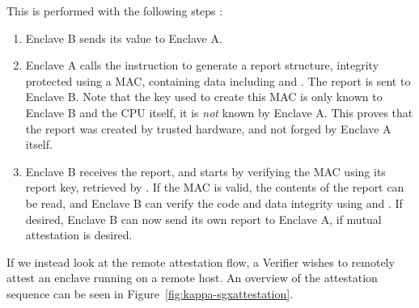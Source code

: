 This is performed with the following steps \cite{anati:2013}:
\begin{enumerate}
	\item Enclave B sends its \sgxmrenclave{} value to Enclave A.
	\item Enclave A calls the \sgxreport{} instruction to generate a report structure, integrity protected using a MAC, containing data including \sgxmrenclave{} and \sgxmrsigner{}.
	The report is sent to Enclave B.
	Note that the key used to create this MAC is only known to Enclave B and the CPU itself, it is \emph{not} known by Enclave A.
	This proves that the report was created by trusted hardware, and not forged by Enclave A itself.
	\item Enclave B receives the report, and starts by verifying the MAC using its report key, retrieved by \sgxgetkey{}.
	If the MAC is valid, the contents of the report can be read, and Enclave B can verify the code and data integrity using \sgxmrenclave{} and \sgxmrsigner{}.
	If desired, Enclave B can now send its own report to Enclave A, if mutual attestation is desired.
\end{enumerate}

If we instead look at the remote attestation flow, a Verifier wishes to remotely attest an enclave running on a remote host.
An overview of the attestation sequence can be seen in Figure~\ref{fig:kappa-sgxattestation}.

